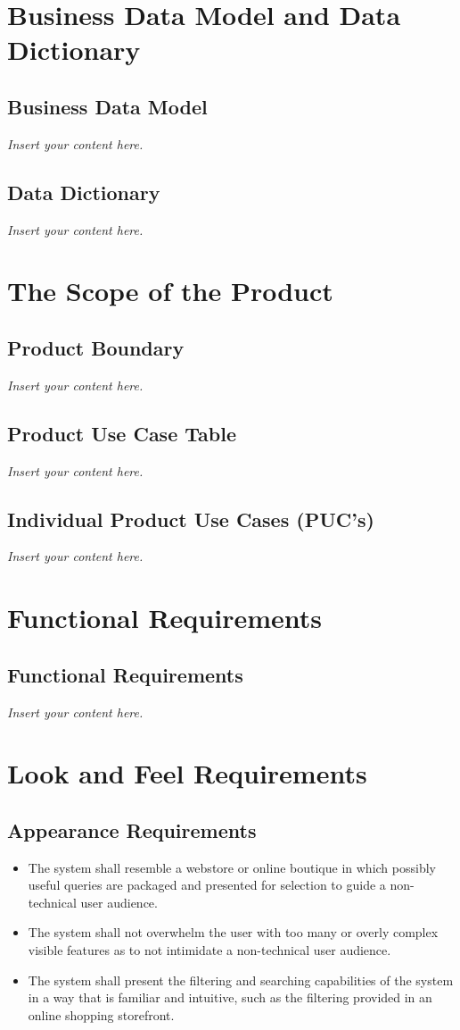 \documentclass[12pt]{article}
\newcommand{\lips}{\textit{Insert your content here.}}
\begin{document}
\section{Business Data Model and Data Dictionary}
\subsection{Business Data Model}
\lips
\subsection{Data Dictionary}
\lips

\section{The Scope of the Product}
\subsection{Product Boundary}
\lips
\subsection{Product Use Case Table}
\lips
\subsection{Individual Product Use Cases (PUC's)}
\lips

\section{Functional Requirements}
\subsection{Functional Requirements}
\lips

\section{Look and Feel Requirements}



\subsection{Appearance Requirements}

\begin{itemize}
    \item The system shall resemble a webstore or online boutique in which possibly useful queries are packaged and presented for selection to guide 
    a non-technical user audience.
    \item The system shall not overwhelm the user with too many or overly complex visible features as to not intimidate a non-technical user audience.
    \item The system shall present the filtering and searching capabilities of the system in a way that is familiar and intuitive, such as the 
    filtering provided in an online shopping storefront.
\end{itemize}
\end{document}

